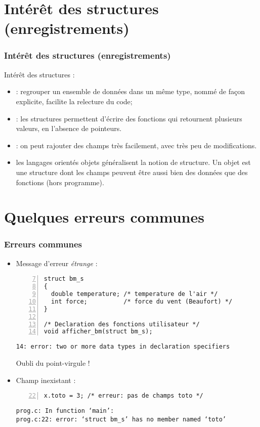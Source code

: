 \documentclass[xcolor=pdftex,svgnames,table]{beamer}
\begin{document}
\section[Intérêt]{Intérêt des structures (enregistrements)}
\begin{frame}
  \frametitle{Intérêt des structures (enregistrements)}

Intérêt des structures  :
  \begin{itemize}
   \item {} : regrouper un ensemble
      de données dans un même type, nommé de façon explicite,
      facilite la relecture du code;\pause
  \item {} : les structures permettent d'écrire des
    fonctions qui retournent plusieurs valeurs, en l'absence de pointeurs.\pause
    \item {} : on peut rajouter des champs très
      facilement, avec très peu de modifications.\pause
    \item {} les langages orientés objets
      généralisent la notion de structure. Un objet est une structure
      dont les champs peuvent être aussi bien des données que des
      fonctions (hors programme).
  \end{itemize}
\end{frame}

\section[Quelques erreurs]{Quelques erreurs communes}
\begin{frame}[fragile]
  \frametitle{Erreurs communes}

\begin{itemize}
\item Message d'erreur \emph{étrange} :
\begin{lstlisting}[numbers=left,basicstyle=\ttfamily\small,firstnumber=7] 
struct bm_s 
{
  double temperature; /* temperature de l'air */
  int force;          /* force du vent (Beaufort) */
}

/* Declaration des fonctions utilisateur */
void afficher_bm(struct bm_s);
\end{lstlisting}
{\small
\begin{verbatim}
14: error: two or more data types in declaration specifiers
\end{verbatim}
}
\pause
\alert{Oubli du point-virgule !}
\pause
\item Champ inexistant :
\begin{lstlisting}[numbers=left,basicstyle=\ttfamily\small,firstnumber=22] 
    x.toto = 3; /* erreur: pas de champs toto */
\end{lstlisting}
{\small
\begin{verbatim}
prog.c: In function ‘main’:
prog.c:22: error: ‘struct bm_s’ has no member named ‘toto’
\end{verbatim}
}
\end{itemize}
\end{frame}
\end{document}
